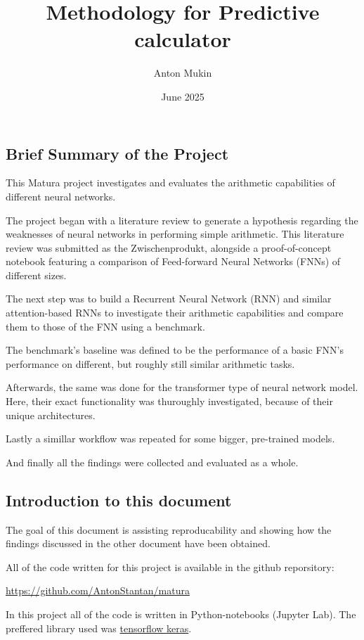 \documentclass{article}
\title{Methodology for Predictive calculator}
\author{Anton Mukin}
\date{June 2025}
\begin{document}
\maketitle

\subsection{Brief Summary of the Project}
This Matura project investigates and evaluates the arithmetic capabilities 
of different neural networks. 

The project began with a literature review to 
generate a hypothesis regarding the weaknesses of neural networks in 
performing simple arithmetic. This literature review was submitted as the 
Zwischenprodukt, alongside a proof-of-concept notebook featuring a 
comparison of Feed-forward Neural Networks (FNNs) of different sizes.

The next step was to build a Recurrent Neural Network (RNN) and similar 
attention-based RNNs to investigate their arithmetic capabilities and 
compare them to those of the FNN using a benchmark.

The benchmark's baseline was defined to be the performance of a basic FNN's 
performance on different, but roughly still similar arithmetic tasks.

Afterwards, the same was done for the transformer type of neural network 
model. Here, their exact functionality was thuroughly investigated, because 
of their unique architectures.

Lastly a simillar workflow was repeated for some bigger, pre-trained models. 

And finally all the findings were collected and evaluated as a whole.


\subsection{Introduction to this document}
The goal of this document is assisting reproducability and showing how the 
findings discussed in the other document have been obtained.

All of the code written for this project is available in the github 
reporsitory: 

\url{https://github.com/AntonStantan/matura}

In this project all of the code is written in Python-notebooks (Jupyter Lab).
The preffered library used was \href{https://www.tensorflow.org/guide/keras}
{tensorflow keras}. 
\end{document}
